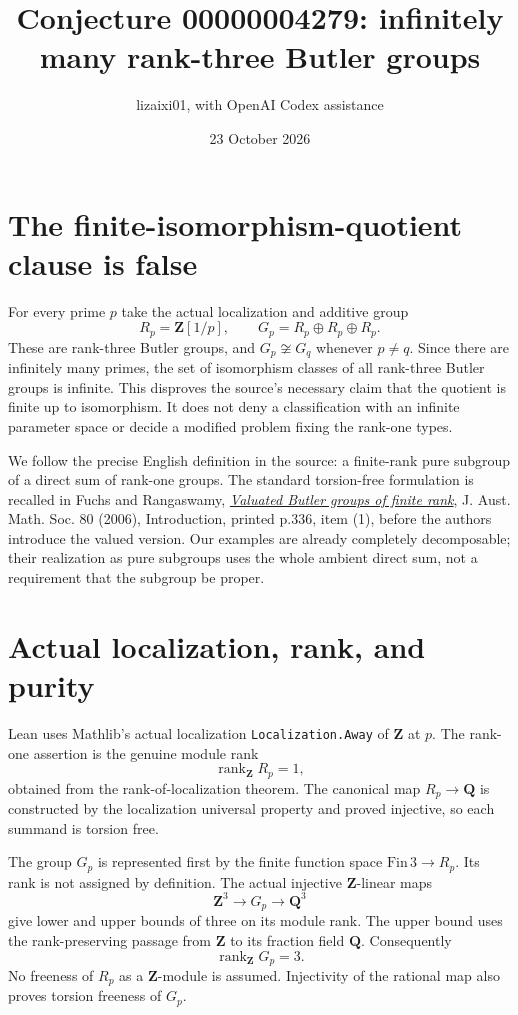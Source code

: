 \documentclass[11pt]{article}
\title{Conjecture 00000004279: infinitely many rank-three Butler groups}
\author{lizaixi01, with OpenAI Codex assistance}
\date{23 October 2026}
\begin{document}
\maketitle
\section{The finite-isomorphism-quotient clause is false}
For every prime $p$ take the actual localization and additive group
\[
 R_p=\mathbf Z[1/p],\qquad G_p=R_p\oplus R_p\oplus R_p.
\]
These are rank-three Butler groups, and $G_p\not\cong G_q$ whenever
$p\ne q$. Since there are infinitely many primes, the set of
isomorphism classes of all rank-three Butler groups is infinite.
This disproves the source's necessary claim that the quotient is finite
up to isomorphism. It does not deny a classification with an infinite
parameter space or decide a modified problem fixing the rank-one types.

We follow the precise English definition in the source: a finite-rank
pure subgroup of a direct sum of rank-one groups. The standard
torsion-free formulation is recalled in Fuchs and Rangaswamy,
\href{https://doi.org/10.1017/S144678870001404X}
{\emph{Valuated Butler groups of finite rank}},
J. Aust. Math. Soc. 80 (2006), Introduction, printed p.336, item (1),
before the authors introduce the valued version.
Our examples are already completely decomposable; their realization
as pure subgroups uses the whole ambient direct sum, not a requirement
that the subgroup be proper.

\section{Actual localization, rank, and purity}
Lean uses Mathlib's actual localization
\texttt{Localization.Away} of $\mathbf Z$ at $p$.
The rank-one assertion is the genuine module rank
\[
 \operatorname{rank}_{\mathbf Z}R_p=1,
\]
obtained from the rank-of-localization theorem. The canonical map
$R_p\to\mathbf Q$ is constructed by the localization universal property
and proved injective, so each summand is torsion free.

The group $G_p$ is represented first by the finite function space
$\mathrm{Fin}\,3\to R_p$. Its rank is not assigned by definition.
The actual injective $\mathbf Z$-linear maps
\[
 \mathbf Z^3\longrightarrow G_p\longrightarrow\mathbf Q^3
\]
give lower and upper bounds of three on its module rank. The upper
bound uses the rank-preserving passage from $\mathbf Z$ to its fraction
field $\mathbf Q$. Consequently
\[
 \operatorname{rank}_{\mathbf Z}G_p=3.
\]
No freeness of $R_p$ as a $\mathbf Z$-module is assumed. Injectivity of
the rational map also proves torsion freeness of $G_p$.
\end{document}
